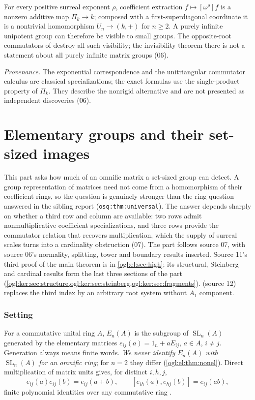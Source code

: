 \documentclass[11pt,oneside]{article}
\numberwithin{equation}{section}
\theoremstyle{definition}
\theoremstyle{remark}
\newcommand{\SL}{\operatorname{SL}}
\newcommand{\coeff}[2]{[\omega^{#1}]#2}
\newcommand{\replabel}[1]{\nolinkurl{#1}}
\newcommand{\status}[1]{\par\smallskip\noindent\textit{Provenance.} #1\par\smallskip}
\begin{document}
For every positive surreal exponent $\rho$, coefficient extraction
$f\mapsto\coeff{\rho}{f}$ is a nonzero additive map $\Pi_k\to k$; composed with a
first-superdiagonal coordinate it is a nontrivial homomorphism $U_n\to(k,+)$
for $n\ge2$. A purely infinite unipotent group can therefore be visible to
small groups. The opposite-root commutators of \cref{ogl:el:part} destroy all
such visibility; the invisibility theorem there is not a statement about all
purely infinite matrix groups (06).

\status{The exponential correspondence and the unitriangular commutator
calculus are classical specializations; the exact formulas use the
single-product property of $\Pi_k$. They describe the nonrigid alternative and
are not presented as independent discoveries (06).}
\part{Elementary groups and their set-sized images}\label{ogl:el:part}

This part asks how much of an omnific matrix a set-sized group can detect. A
group representation of matrices need not come from a homomorphism of their
coefficient rings, so the question is genuinely stronger than the ring question
answered in the sibling report (\replabel{osq:thm:universal}). The answer
depends sharply on whether a third row and column are available: two rows admit
nonmultiplicative coefficient specializations, and three rows provide the
commutator relation that recovers multiplication, which the supply of surreal
scales turns into a cardinality obstruction (07). The part follows source 07,
with source 06's normality, splitting, tower and boundary results inserted.
Source 11's third proof of the main theorem is in \cref{ogl:el:sec:high}; its
structural, Steinberg and cardinal results form the last three sections of the
part (\cref{ogl:ker:sec:structure,ogl:ker:sec:steinberg,ogl:ker:sec:fragments}).
 (source 12) replaces the third index by an arbitrary root
system without $A_1$ component.

\section{Setting}\label{ogl:el:sec:setting}

For a commutative unital ring $A$, $E_n(A)$ is the subgroup of $\SL_n(A)$
generated by the elementary matrices $e_{ij}(a)=1_n+aE_{ij}$, $a\in A$,
$i\ne j$. Generation always means finite words. \emph{We never identify
$E_n(A)$ with $\SL_n(A)$ for an omnific ring}; for $n=2$ they differ
(\cref{ogl:el:thm:nonel}). Direct multiplication of matrix units gives, for
distinct $i,h,j$,
\begin{equation}\label{ogl:el:eq:steinberg}
 e_{ij}(a)e_{ij}(b)=e_{ij}(a+b),\qquad
 [e_{ih}(a),e_{hj}(b)]=e_{ij}(ab),
\end{equation}
finite polynomial identities over any commutative ring \cite[Chapter~III, Section~1]{Weibel}.
\end{document}
